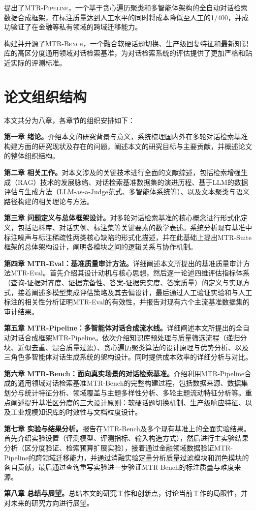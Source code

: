 提出了\textsc{MTR-Pipeline}，一个基于贪心遍历聚类和多智能体架构的全自动对话检索数据合成框架，在标注质量达到人工水平的同时将成本降低至人工的1/400，并成功验证了在金融等私有领域的跨域迁移能力。
    
构建并开源了\textsc{MTR-Bench}，一个融合软硬话题切换、生产级回复特征和最新知识库的高区分度通用领域对话检索基准，为对话检索系统的评估提供了更加严格和贴近实际的评测标准。



\section{论文组织结构}

本文共分为八章，各章节的组织安排如下：

\textbf{第一章 绪论。}介绍本文的研究背景与意义，系统梳理国内外在多轮对话检索基准构建方面的研究现状及存在的问题，阐述本文的研究目标与主要贡献，并概述论文的整体组织结构。

\textbf{第二章 相关工作。}对本文涉及的关键技术进行全面的文献综述，包括检索增强生成（RAG）技术的发展脉络、对话检索基准数据集的演进历程、基于LLM的数据评估与生成方法（LLM-as-a-Judge范式、多智能体系统等）、以及文本聚类与语义路径构建的相关理论与方法。

\textbf{第三章 问题定义与总体框架设计。}对多轮对话检索基准的核心概念进行形式化定义，包括语料库、对话实例、标注集等关键要素的数学表述。系统分析现有基准中标注噪声与标注稀疏性两类核心缺陷的形式化描述，并在此基础上提出MTR-Suite框架的总体架构设计，阐明各模块之间的逻辑关系与协作机制。

\textbf{第四章 MTR-Eval：基准质量审计方法。}详细阐述本文所提出的基准质量审计方法MTR-Eval。首先介绍其设计动机与核心思想，然后逐一论述四维评估指标体系（查询-证据对齐度、证据完备性、答案-证据忠实度、答案质量）的定义与实现方式，接着阐述多模型集成评估策略及其去偏设计，最后通过人工验证实验和与人工标注的相关性分析证明MTR-Eval的有效性，并报告对现有六个主流基准数据集的审计结果。

\textbf{第五章 MTR-Pipeline：多智能体对话合成流水线。}详细阐述本文所提出的全自动对话合成框架MTR-Pipeline。依次介绍知识库预处理与质量筛选流程（递归分块、近似去重、混合质量过滤）、贪心遍历聚类算法的设计原理与优势分析、以及三角色多智能体对话生成系统的架构设计。同时提供成本效率的详细分析与对比。

\textbf{第六章 MTR-Bench：面向真实场景的对话检索基准。}介绍利用MTR-Pipeline合成的通用领域对话检索基准MTR-Bench的完整构建过程，包括数据来源、数据集划分与统计特征分析、领域覆盖与主题多样性分析、多轮主题流动特征分析等。重点阐述提升基准区分度的三大设计原则：软硬话题切换机制、生产级响应特征、以及工业规模知识库的时效性与文档粒度设计。

\textbf{第七章 实验与结果分析。}报告在MTR-Bench及多个现有基准上的全面实验结果。首先介绍实验设置（评测模型、评测指标、输入构造方式），然后进行主实验结果分析（区分度验证、检索预算扩展实验），接着通过金融领域数据验证MTR-Pipeline的跨领域迁移能力，并通过消融实验定量分析质量过滤模块和润色模块的各自贡献，最后通过查询重写实验进一步验证MTR-Bench的标注质量与难度来源。

\textbf{第八章 总结与展望。}总结本文的研究工作和创新点，讨论当前工作的局限性，并对未来的研究方向进行展望。


